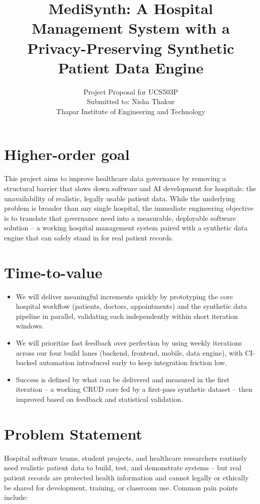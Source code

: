 \documentclass[11pt]{article}
\title{\textbf{MediSynth: A Hospital Management System with a Privacy-Preserving Synthetic Patient Data Engine}}
\author{Project Proposal for UCS503P \\ Submitted to: Nisha Thakur \\ Thapar Institute of Engineering and Technology}
\date{}
\begin{document}
\maketitle

\section{Higher-order goal}
This project aims to improve healthcare data governance by removing a structural barrier that slows down software and AI development for hospitals: the unavailability of realistic, legally usable patient data. While the underlying problem is broader than any single hospital, the immediate engineering objective is to translate that governance need into a measurable, deployable software solution -- a working hospital management system paired with a synthetic data engine that can safely stand in for real patient records.

\section{Time-to-value}
\begin{itemize}
    \item We will deliver meaningful increments quickly by prototyping the core hospital workflow (patients, doctors, appointments) and the synthetic data pipeline in parallel, validating each independently within short iteration windows.
    \item We will prioritize fast feedback over perfection by using weekly iterations across our four build lanes (backend, frontend, mobile, data engine), with CI-backed automation introduced early to keep integration friction low.
    \item Success is defined by what can be delivered and measured in the first iteration -- a working CRUD core fed by a first-pass synthetic dataset -- then improved based on feedback and statistical validation.
\end{itemize}

\section{Problem Statement}
Hospital software teams, student projects, and healthcare researchers routinely need realistic patient data to build, test, and demonstrate systems -- but real patient records are protected health information and cannot legally or ethically be shared for development, training, or classroom use. Common pain points include:
\end{document}
